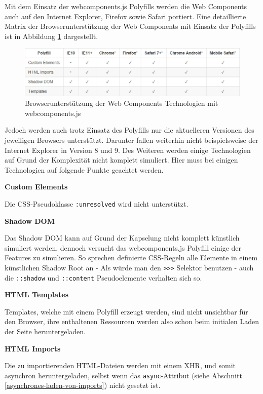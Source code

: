 Mit dem Einsatz der webcomponents.js Polyfills werden die Web Components auch auf den Internet Explorer, Firefox sowie Safari portiert. Eine detaillierte Matrix der Browserunterstützung der Web Components mit Einsatz der Polyfills ist in Abbildung \ref{fig:bdwctmwcjs} \cite{citeulike:13914238} dargestellt.

\begin{figure}[htbp]
 \centering
 \includegraphics[width=\linewidth]{kapitel2/bilder/6-webcomponentsjs-browserunterstuetzung}
 \caption{Browserunterstützung der Web Components Technologien mit webcomponents.js}
 \label{fig:bdwctmwcjs}
\end{figure}

Jedoch werden auch trotz Einsatz des Polyfills nur die aktuelleren Versionen des jeweiligen Browsers unterstützt. Darunter fallen weiterhin nicht beispielsweise der Internet Explorer in Version 8 und 9. Des Weiteren werden einige Technologien auf Grund der Komplexität nicht komplett simuliert. Hier muss bei einigen Technologien auf folgende Punkte geachtet werden.

\textbf{Custom Elements}

Die \ac{CSS}-Pseudoklasse \texttt{:unresolved} wird nicht unterstützt.

\textbf{Shadow \ac{DOM}}

Das Shadow \ac{DOM} kann auf Grund der Kapselung nicht komplett künstlich simuliert werden, dennoch versucht das webcomponents.js Polyfill einige der Features zu simulieren. So sprechen definierte \ac{CSS}-Regeln alle Elemente in einem künstlichen Shadow Root an - Als würde man den \texttt{\textgreater{}\textgreater{}\textgreater{}} Selektor benutzen - auch die \texttt{::shadow} und \texttt{::content} Pseudoelemente verhalten sich so.

\textbf{\ac{HTML} Templates}

Templates, welche mit einem Polyfill erzeugt werden, sind nicht unsichtbar für den Browser, ihre enthaltenen Ressourcen werden also schon beim initialen Laden der Seite heruntergeladen.

\textbf{\ac{HTML} Imports}

Die zu importierenden \ac{HTML}-Dateien werden mit einem \ac{XHR}, und somit asynchron heruntergeladen, selbst wenn das \texttt{async}-Attribut (siehe Abschnitt \ref{asynchrones-laden-von-imports}) nicht gesetzt ist.


